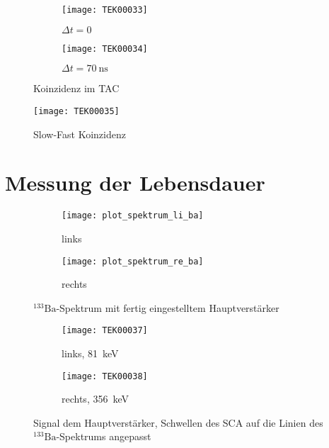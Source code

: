 \documentclass[11pt, ngerman, fleqn, DIV=15, headinclude, BCOR=2cm]{scrreprt}
\begin{document}
\fehlt%

\begin{figure}
	\centering
	\begin{subfigure}{0.49 \textwidth}
		\texttt{[image: TEK00033]}
		\caption{%
			$\Delta t = 0$
		}
		\label{fig:fast_signal_tac_koinzidenz-t0}
	\end{subfigure}
	\begin{subfigure}{0.49 \textwidth}
		\texttt{[image: TEK00034]}
		\caption{%
			$\Delta t = \SI{70}{\nano\second}$
		}
		\label{fig:fast_signal_tac_koinzidenz-t5-16}
	\end{subfigure}
	\caption{%
		Koinzidenz im TAC
	}
	\label{fig:fast_signal_tac_koinzidenz}
\end{figure}

\begin{figure}
	\centering
	\texttt{[image: TEK00035]}
	\caption{%
		Slow-Fast Koinzidenz
	}
	\label{fig:slow_fast_koinzidenz}
\end{figure}

\fehlt%

\clearpage

\section{Messung der Lebensdauer}

\begin{figure}
	\centering
	\begin{subfigure}{0.49 \textwidth}
		\texttt{[image: plot\_spektrum\_li\_ba]}
		\caption{%
			links
		}
		\label{fig:ba_slow_hv_eingestellt-li_plot}
	\end{subfigure}
	\begin{subfigure}{0.49 \textwidth}
		\texttt{[image: plot\_spektrum\_re\_ba]}
		\caption{%
			rechts
		}
		\label{fig:ba_slow_hv_eingestellt-re_plot}
	\end{subfigure}
	\caption{%
		$^{133}\text{Ba}$-Spektrum mit fertig eingestelltem
		Hauptverstärker
	}
	\label{fig:ba_slow_signal_hv_eingestellt_plot}
\end{figure}

\begin{figure}
	\centering
	\begin{subfigure}{0.49 \textwidth}
		\texttt{[image: TEK00037]}
		\caption{%
			links, \SI{81}{\kilo\electronvolt}
		}
		\label{fig:ba_slow_signal_sca_eingestellt-li}
	\end{subfigure}
	\begin{subfigure}{0.49 \textwidth}
		\texttt{[image: TEK00038]}
		\caption{%
			rechts, \SI{356}{\kilo\electronvolt}
		}
		\label{fig:ba_slow_signal_sca_eingestellt-re}
	\end{subfigure}
	\caption{%
		Signal dem Hauptverstärker, Schwellen des SCA auf die Linien
		des $^{133}\text{Ba}$-Spektrums angepasst
	}
	\label{fig:ba_slow_signal_sca_eingestellt}
\end{figure}
\end{document}
